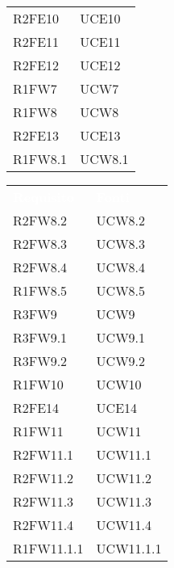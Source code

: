 \begin{table}[!htbp]
\begin{tabular}[t]{ m{}<{\centering}  m{}<{\centering} }
	R2FE10 & UCE10\\
	
	R2FE11 & UCE11\\
	 
	R2FE12 & UCE12\\	
	
	R1FW7 & UCW7\\
	
	R1FW8 & UCW8\\		
	
	R2FE13 & UCE13\\	
	 
	R1FW8.1 & UCW8.1\\	

\end{tabular}
\begin{tabular}[t]{ m{}<{\centering}  m{}<{\centering} }
	\rowcolor{darkblue}
	\textcolor{white}{\textbf{Requisito}} &\textcolor{white}{\textbf{Fonti}}\\ 			 

	R2FW8.2 & UCW8.2\\	 
	 
	R2FW8.3 & UCW8.3\\	
	 
	R2FW8.4 & UCW8.4\\	 
	 
	R1FW8.5 & UCW8.5\\	 
	 
	R3FW9 & UCW9\\	
	 
	R3FW9.1 & UCW9.1\\	 
	 
	R3FW9.2 & UCW9.2\\	  
	 
	R1FW10 & UCW10 \\	 
	 
	R2FE14 & UCE14\\	 
	 	 
	R1FW11 & UCW11\\	 	
	
	R2FW11.1 & UCW11.1 \\
 	
 	R2FW11.2 & UCW11.2 \\
 	
	R2FW11.3 & UCW11.3 \\
 
	R2FW11.4 & UCW11.4 \\
	
	R1FW11.1.1 & UCW11.1.1 \\
		

\end{tabular}
\end{table}
